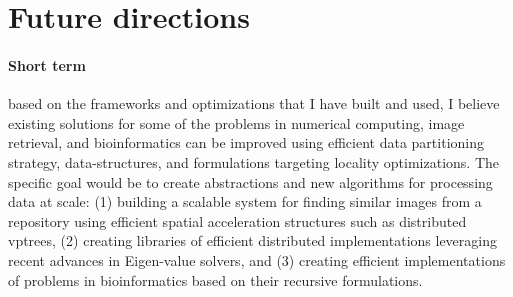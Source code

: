 


\section*{Future directions}
\paragraph{Short term} based on the frameworks and optimizations that I have built and used, I believe existing solutions for some of the problems in numerical computing, image retrieval, and bioinformatics can be improved using efficient data partitioning strategy, data-structures, and formulations targeting locality optimizations.  
The specific goal would be to create abstractions and new algorithms for processing data at scale:
(1) building a scalable system for finding similar images from a repository using efficient spatial acceleration structures such as distributed vptrees,
(2) creating libraries of efficient distributed implementations leveraging recent advances in Eigen-value solvers, and 
(3) creating efficient implementations of problems in bioinformatics based on their recursive formulations. 

